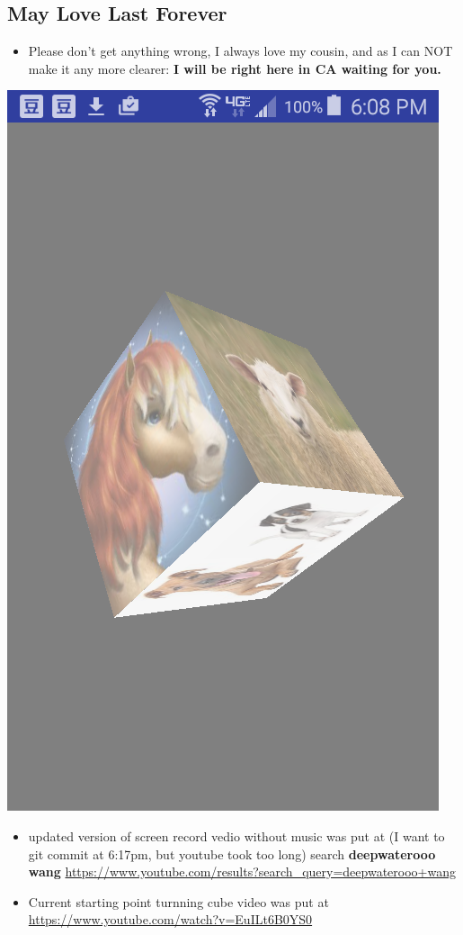 \documentclass[9pt,b5paper]{article}
\begin{document}
\subsection{May Love Last Forever}
\label{sec-1-1}
\begin{itemize}
\item Please don't get anything wrong, I always love my cousin, and as I can NOT make it any more clearer: \textbf{I will be right here in CA waiting for you.}
\end{itemize}

\includegraphics[width=.9\linewidth]{./Screenshot_2016-05-06-18-08-06.png}
\begin{itemize}
\item updated version of screen record vedio without music was put at (I want to git commit at 6:17pm, but youtube took too long) search \textbf{deepwaterooo wang} \url{https://www.youtube.com/results?search_query=deepwaterooo+wang}
\item Current starting point turnning cube video was put at \url{https://www.youtube.com/watch?v=EuILt6B0YS0}
\end{itemize}
\end{document}

